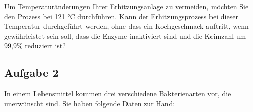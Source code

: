 \documentclass[a4paper,11pt]{article}
\newif\ifshowme
\begin{document}
\begin{center}
\end{center}

Um Temperaturänderungen Ihrer Erhitzungsanlage zu vermeiden, möchten Sie den
Prozess bei 121 °C durchführen. \pp 
Kann der Erhitzungsprozess bei dieser Temperatur
durchgeführt werden, ohne dass ein Kochgeschmack auftritt, wenn gewährleistet sein
soll, dass die Enzyme inaktiviert sind und die Keimzahl um 99,9\% reduziert ist? 



\ifshowme
\antwort{

Formel für die Aufgabe:

\begin{align}
D_1 = D_2 \cdot 10^{\frac{T_2 - T_1}{z}}
\end{align}


Reduktion der Keimzahl:
\begin{align*}
D_1 &= 5 ~\text{min} \cdot 10^{\frac{112 - 121}{10}} \\
 &= 0,629 ~\text{min}
\end{align*}

Enzyminaktivierung:
\begin{align*}
D_1 &= 15 ~\text{min} \cdot 10^{\frac{90 - 121}{25}} \\
 &= 0,86 ~\text{min}
\end{align*}

Kochgeschmack
\begin{align*}
D_1 &= 20 ~\text{min} \cdot 10^{\frac{100 - 121}{32}} \\
 &= 4,413 ~\text{min}
\end{align*}

 Da 0,629 min + 0,012 min kürzer ist als 4,413 min, kann der Erhitzungsprozess bei dieser Temperatur
durchgeführt werden, ohne dass ein Kochgeschmack auftritt.
}
\else
\fi

\subsection*{Aufgabe 2}
In einem Lebensmittel kommen drei verschiedene Bakterienarten vor, die unerwünscht
sind. Sie haben folgende Daten zur Hand:
\end{document}
